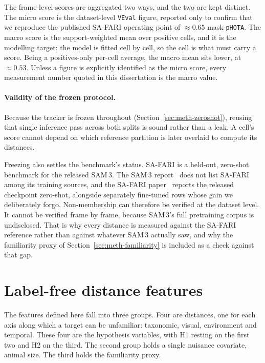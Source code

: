 The frame-level scores are aggregated two ways, and the two are kept distinct. The micro score is the
dataset-level \texttt{VEval} figure, reported only to confirm that we reproduce the published SA-FARI operating
point of $\approx\!0.65$ mask-\texttt{pHOTA}. The macro score is the support-weighted mean over positive cells,
and it is the modelling target: the model is fitted cell by cell, so the cell is what must carry a score. Being
a positives-only per-cell average, the macro mean sits lower, at $\approx\!0.53$. Unless a figure is explicitly
identified as the micro score, every measurement number quoted in this dissertation is the macro value.

\paragraph{Validity of the frozen protocol.} Because the tracker is frozen throughout
(Section~\ref{sec:meth-zeroshot}), reusing that single inference pass across both splits is sound rather than
a leak. A cell's score cannot depend on which reference partition is later overlaid to compute its distances.

Freezing also settles the benchmark's status. SA-FARI is a held-out, zero-shot benchmark for the released
SAM\,3. The SAM\,3 report~\cite{sam3} does not list SA-FARI among its training sources, and the SA-FARI
paper~\cite{safari} reports the released checkpoint zero-shot, alongside separately fine-tuned rows whose gain
we deliberately forgo. Non-membership can therefore be verified at the dataset level. It cannot be verified
frame by frame, because SAM\,3's full pretraining corpus is undisclosed. That is why every distance is measured
against the SA-FARI reference rather than against whatever SAM\,3 actually saw, and why the familiarity proxy
of Section~\ref{sec:meth-familiarity} is included as a check against that gap.

\section{Label-free distance features}
\label{sec:meth-features}
The features defined here fall into three groups. Four are distances, one for each axis along which a target
can be unfamiliar: taxonomic, visual, environment and temporal. These four are the hypothesis variables, with
H1 resting on the first two and H2 on the third. The second group holds a single nuisance covariate, animal
size. The third holds the familiarity proxy.

